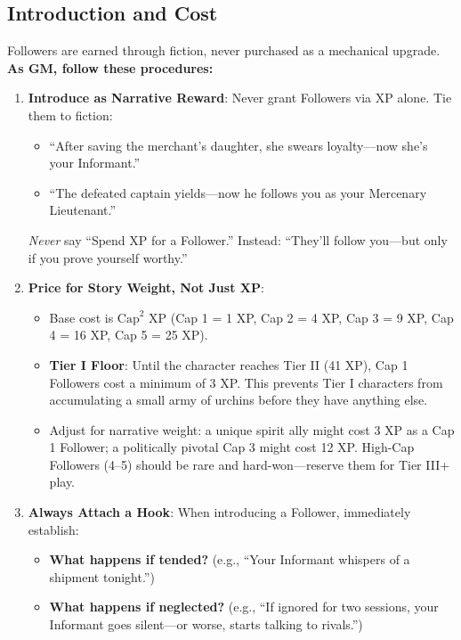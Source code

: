 \subsection{Introduction and Cost}
Followers are earned through fiction, never purchased as a mechanical upgrade. \textbf{As GM, follow these procedures:}

\begin{enumerate}
  \item \textbf{Introduce as Narrative Reward}: Never grant Followers via XP alone. Tie them to fiction:  
        \begin{itemize}
          \item ``After saving the merchant's daughter, she swears loyalty---now she's your Informant.''  
          \item ``The defeated captain yields---now he follows you as your Mercenary Lieutenant.''  
        \end{itemize}
        \textit{Never} say ``Spend XP for a Follower.'' Instead: ``They'll follow you---but only if you prove yourself worthy.''  
  \item \textbf{Price for Story Weight, Not Just XP}:  
        \begin{itemize}
          \item Base cost is $\text{Cap}^2$ XP (Cap 1 = 1 XP, Cap 2 = 4 XP, Cap 3 = 9 XP, Cap 4 = 16 XP, Cap 5 = 25 XP).
          \item \textbf{Tier I Floor}: Until the character reaches Tier II (41 XP), Cap 1 Followers cost a minimum of 3 XP. This prevents Tier I characters from accumulating a small army of urchins before they have anything else.
          \item Adjust for narrative weight: a unique spirit ally might cost 3 XP as a Cap 1 Follower; a politically pivotal Cap 3 might cost 12 XP. High-Cap Followers (4--5) should be rare and hard-won---reserve them for Tier III+ play.
        \end{itemize}
  \item \textbf{Always Attach a Hook}: When introducing a Follower, immediately establish:  
        \begin{itemize}
          \item \textbf{What happens if tended?} (e.g., ``Your Informant whispers of a shipment tonight.'')  
          \item \textbf{What happens if neglected?} (e.g., ``If ignored for two sessions, your Informant goes silent---or worse, starts talking to rivals.'')  
        \end{itemize}
\end{enumerate}

